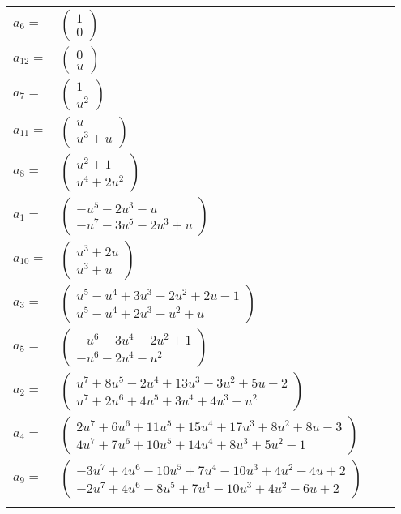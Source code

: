 \documentclass[1p]{elsarticle_modified}
\theoremstyle{definition}
\begin{document}
\begin{tabular}{m{7pt} m{180pt} m{7pt} m{180pt} }
\flushright $a_{6}=$&$\begin{pmatrix}1\\0\end{pmatrix}$ \\
\flushright $a_{12}=$&$\begin{pmatrix}0\\u\end{pmatrix}$ \\
\flushright $a_{7}=$&$\begin{pmatrix}1\\u^2\end{pmatrix}$ \\
\flushright $a_{11}=$&$\begin{pmatrix}u\\u^3+u\end{pmatrix}$ \\
\flushright $a_{8}=$&$\begin{pmatrix}u^2+1\\u^4+2 u^2\end{pmatrix}$ \\
\flushright $a_{1}=$&$\begin{pmatrix}- u^5-2 u^3- u\\- u^7-3 u^5-2 u^3+u\end{pmatrix}$ \\
\flushright $a_{10}=$&$\begin{pmatrix}u^3+2 u\\u^3+u\end{pmatrix}$ \\
\flushright $a_{3}=$&$\begin{pmatrix}u^5- u^4+3 u^3-2 u^2+2 u-1\\u^5- u^4+2 u^3- u^2+u\end{pmatrix}$ \\
\flushright $a_{5}=$&$\begin{pmatrix}- u^6-3 u^4-2 u^2+1\\- u^6-2 u^4- u^2\end{pmatrix}$ \\
\flushright $a_{2}=$&$\begin{pmatrix}u^7+8 u^5-2 u^4+13 u^3-3 u^2+5 u-2\\u^7+2 u^6+4 u^5+3 u^4+4 u^3+u^2\end{pmatrix}$ \\
\flushright $a_{4}=$&$\begin{pmatrix}2 u^7+6 u^6+11 u^5+15 u^4+17 u^3+8 u^2+8 u-3\\4 u^7+7 u^6+10 u^5+14 u^4+8 u^3+5 u^2-1\end{pmatrix}$ \\
\flushright $a_{9}=$&$\begin{pmatrix}-3 u^7+4 u^6-10 u^5+7 u^4-10 u^3+4 u^2-4 u+2\\-2 u^7+4 u^6-8 u^5+7 u^4-10 u^3+4 u^2-6 u+2\end{pmatrix}$\\&\end{tabular}
\end{document}

